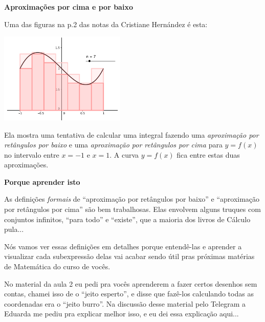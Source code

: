 \documentclass[oneside,12pt]{article}
\begin{document}
\newpage



{\bf Aproximações por cima e por baixo}

Uma das figuras na p.2 das notas da Cristiane Hernández é esta:


\includegraphics[width=6cm]{2020-1-C2/area-hernandez-1.png}

Ela mostra uma tentativa de calcular uma integral fazendo uma {\sl
  aproximação por retângulos por baixo} e uma {\sl aproximação por
  retângulos por cima} para $y=f(x)$ no intervalo entre $x=-1$ e
$x=1$. A curva $y=f(x)$ fica entre estas duas aproximações.

\newpage


{\bf Porque aprender isto}

\ssk

As definições {\sl formais} de ``aproximação por retângulos por
baixo'' e ``aproximação por retângulos por cima'' são bem trabalhosas.
Elas envolvem alguns truques com conjuntos infinitos, ``para todo'' e
``existe'', que a maioria dos livros de Cálculo pula...

Nós vamos ver essas definições em detalhes porque entendê-las e
aprender a visualizar cada subexpressão delas vai acabar sendo
 útil pras próximas matérias de Matemática do curso de
vocês.

No material da aula 2 eu pedi pra vocês aprenderem a fazer certos
desenhos sem contas, chamei isso de o ``jeito esperto'', e disse que
fazê-los calculando todas as coordenadas era o ``jeito burro''. Na
discussão desse material pelo Telegram a Eduarda me pediu pra explicar
melhor isso, e eu dei essa explicação aqui...

\newpage
\end{document}
